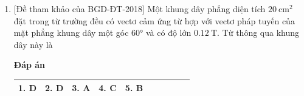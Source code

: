 \begin{enumerate}
{			
	}
	\item
	{
		[Đề tham khảo của BGD-ĐT-2018] Một khung dây phẳng diện tích $\SI{20}{\centi \meter \squared}$ đặt trong từ trường đều có vectơ cảm ứng từ hợp với vectơ pháp tuyến của mặt phẳng khung dây một góc $\ang{60}$ và có độ lớn $\SI{0.12}{\tesla}$. Từ thông qua khung dây này là
	}
	\textbf{Đáp án}
	\begin{center}
		\begin{tabular}{|m{2.8em}|m{2.8em}|m{2.8em}|m{2.8em}|m{2.8em}|m{2.8em}|m{2.8em}|m{2.8em}|m{2.8em}|m{2.8em}|}
			\hline
			1. D & 2. D & 3. A & 4. C & 5. B &&&&&\\
			\hline
		\end{tabular}
	\end{center}
\end{enumerate}
